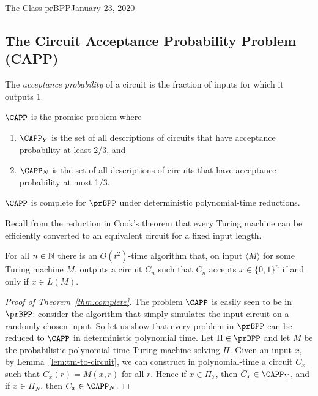 \begin{lecture}{1}{The Class prBPP}{January 23, 2020}
\subsection{The Circuit Acceptance Probability Problem (CAPP)}

The \emph{acceptance probability} of a circuit is the fraction of inputs for
which it outputs 1.

\begin{definition}[$\CAPP$]
  $\CAPP$ is the promise problem where
  \begin{enumerate}
    \item $\CAPP_Y$ is the set of all descriptions of circuits that have
      acceptance probability at least 2/3, and
    \item $\CAPP_N$ is the set of all descriptions of circuits that have
      acceptance probability at most 1/3.
  \end{enumerate}
\end{definition}

\begin{theorem}\label{thm:complete}
  $\CAPP$ is complete for $\prBPP$ under deterministic polynomial-time reductions.
\end{theorem}

Recall from the reduction in Cook's theorem that every Turing machine can be
efficiently converted to an equivalent circuit for a fixed input length.
\begin{lemma}\label{lem:tm-to-circuit}
  For all $n \in \mathbb{N}$ there is an $O(t^2)$-time algorithm that, on input
  $\langle M \rangle$ for some Turing machine $M$, outputs a circuit $C_n$ such
  that $C_n$ accepts $x \in \{0, 1\}^n$ if and only if $x \in L(M)$.
\end{lemma}

\begin{proof}[Proof of Theorem~\ref{thm:complete}]
  The problem $\CAPP$ is easily seen to be in $\prBPP$: consider the algorithm
  that simply simulates the input circuit on a randomly chosen input. So let us
  show that every problem in $\prBPP$ can be reduced to $\CAPP$ in
  deterministic polynomial time. Let $\Pi \in \prBPP$ and let $M$ be the
  probabilistic polynomial-time Turing machine solving $\Pi$. Given an input
  $x$, by Lemma~\ref{lem:tm-to-circuit}, we can construct in polynomial-time a
  circuit $C_x$ such that $C_x(r) = M(x, r)$ for all $r$. Hence if $x \in
  \Pi_Y$, then $C_x \in \CAPP_Y$, and if $x \in \Pi_N$, then $C_x \in \CAPP_N$.
\end{proof}


\end{lecture}

